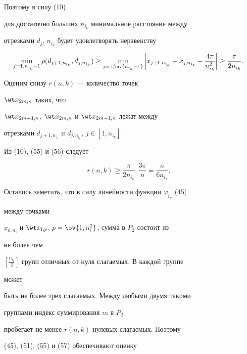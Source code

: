 \begin{pf}
Поэтому в силу (10) 


для достаточно больших $n_{i_k}$ минимальное расстояние между 


отрезками $d_j$, $n_{i_k}$ будет удовлетворять неравенству 


\begin{equation} 


\min_{j=1,n_{i_k}-1}\rho(d_{j+1,n_{i_k}}, 


d_{j,n_{i_k}})\ge\min_{j=1,\ov{n_{i_k}-1}}\bigg| 


x_{j+1,n_{i_k}}-x_{j,n_{i_k}}-\frac{4\pi}{n^2_{i_k}}\bigg| 


\ge\frac{\pi}{2n_{i_k}}. 


\end{equation} 


 


Оценим снизу $r(n,k)$ --- количество точек 


$\wt x_{2m,n}$ таких, что 


$\wt x_{2m+1,n}$, $\wt x_{2m,n}$ и $\wt x_{2m-1,n}$ лежат между 


отрезками $d_{j+1,n_{i_k}}$ и $d_{j,n_{i_k}}$, $j\in[1,n_{i_k}]$. 


Из (10), (55) и (56) следует 


\begin{equation} 


r(n,k)\ge\frac{\pi}{2n_{i_k}}{:}\frac{3\pi}{n}=\frac{n}{6n_{i_k}}. 


\end{equation} 


 


Осталось заметить, что в силу линейности функции $\varphi_{i_k}$ (45) 


между точками 


$x_{k,n_i}$ и $\wt x_{l,p}$, $p=\ov{1,n^2_i}$, сумма в $P_2$ состоит из 


не более чем 


$[\frac{n_{i_l}}{2}]$ групп отличных от нуля слагаемых. В каждой группе 


может 


быть не более трех слагаемых. Между любыми двумя такими 


группами индекс суммирования $m$ в $P_2$ 


пробегает не менее $r(n,k)$ нулевых слагаемых. Поэтому 


(45), (51), (55) и (57) обеспечивают оценку 



\end{pf}
